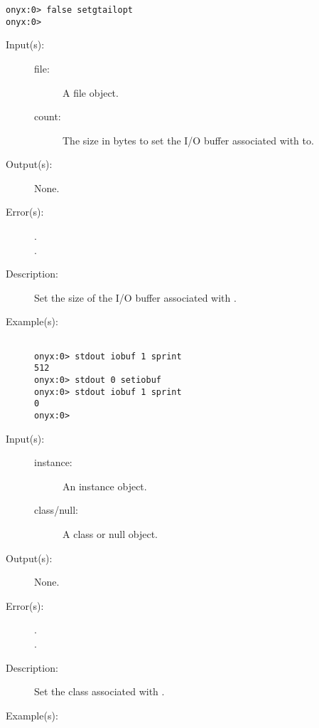 \begin{description}
\begin{description}
\begin{verbatim}
onyx:0> false setgtailopt
onyx:0>
		\end{verbatim}
	\end{description}
\label{systemdict:setiobuf}
\item[{\onyxop{file count}{setiobuf}{--}}: ]
	\begin{description}\item[]
	\item[Input(s): ]
		\begin{description}\item[]
		\item[file: ]
			A file object.
		\item[count: ]
			The size in bytes to set the I/O buffer associated with
			 to.
		\end{description}
	\item[Output(s): ] None.
	\item[Error(s): ]
		\begin{description}\item[]
		\item[.]
		\item[.]
		\end{description}
	\item[Description: ]
		Set the size of the I/O buffer associated with .
	\item[Example(s): ]\begin{verbatim}

onyx:0> stdout iobuf 1 sprint
512
onyx:0> stdout 0 setiobuf
onyx:0> stdout iobuf 1 sprint
0
onyx:0>
		\end{verbatim}
	\end{description}
\label{systemdict:setisa}
\item[{\onyxop{instance class/null}{setisa}{--}}: ]
	\begin{description}\item[]
	\item[Input(s): ]
		\begin{description}\item[]
		\item[instance: ]
			An instance object.
		\item[class/null: ]
			A class or null object.
		\end{description}
	\item[Output(s): ] None.
	\item[Error(s): ]
		\begin{description}\item[]
		\item[.]
		\item[.]
		\end{description}
	\item[Description: ]
		Set the class associated with .
	\item[Example(s): ]\begin{verbatim}


\end{verbatim}
\end{description}
\end{description}
